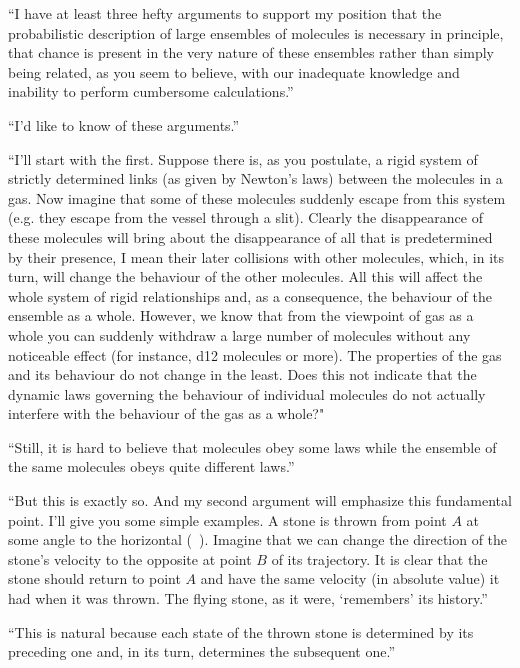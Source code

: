 \begin{dialogue}
\athr ``I have at least three hefty arguments to support my position that the probabilistic description of large ensembles of molecules is necessary in principle, that chance is present in the very nature of these ensembles rather than simply being related, as you seem to believe, with our inadequate knowledge and inability to perform cumbersome calculations.''

\prtnr ``I'd like to know of these arguments.''

\athr ``I'll start with the first. Suppose there is, as you postulate,
a rigid system of strictly determined links (as given by Newton's laws) between the molecules in a gas. Now imagine that some of these molecules suddenly escape from this system (e.g. they escape from the vessel through a slit). Clearly the disappearance of these molecules will bring about the disappearance of all that is predetermined by their presence, I mean their later collisions with other molecules, which, in its turn, will change the behaviour of the other molecules. All this will affect the whole system of rigid relationships and, as a consequence, the behaviour of the ensemble as a whole. However, we know that from the viewpoint of gas as a whole you can suddenly withdraw a large number of molecules without any noticeable effect (for instance, \num{d12} molecules or more). The properties of the gas and its behaviour do not change in the least. Does this not indicate that the dynamic laws governing the behaviour of individual molecules do not actually interfere with the behaviour of the gas as a whole?"

\prtnr ``Still, it is hard to believe that molecules obey some laws while the ensemble of the same molecules obeys quite different laws.''




\athr ``But this is exactly so. And my second argument will emphasize this fundamental point. I'll give you some simple examples. A stone is thrown from point $A$ at some angle to the horizontal (~). Imagine that we can change the direction of the stone's velocity to the opposite at point $B$ of its trajectory. It is clear that the stone should return to point $A$ and have the same velocity (in absolute value) it had when it was thrown. The flying stone, as it were, `remembers' its history.''

\prtnr ``This is natural because each state of the thrown stone is
determined by its preceding one and, in its turn, determines the subsequent one.''


\end{dialogue}
